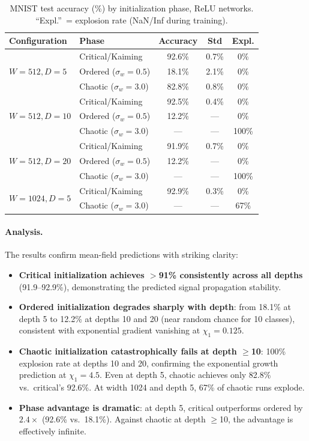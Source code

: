 \documentclass[10pt]{article}
\begin{document}
\begin{table}[t]
\centering
\caption{MNIST test accuracy (\%) by initialization phase, ReLU networks. ``Expl.''\ = explosion rate (NaN/Inf during training).}
\label{tab:mnist-results}
\small
\begin{tabular}{@{}llccc@{}}
\toprule
\textbf{Configuration} & \textbf{Phase} & \textbf{Accuracy} & \textbf{Std} & \textbf{Expl.} \\
\midrule
\multirow{3}{*}{$W\!=\!512, D\!=\!5$}
  & Critical/Kaiming & 92.6\% & 0.7\% & 0\% \\
  & Ordered ($\sigma_w\!=\!0.5$) & 18.1\% & 2.1\% & 0\% \\
  & Chaotic ($\sigma_w\!=\!3.0$) & 82.8\% & 0.8\% & 0\% \\
\midrule
\multirow{3}{*}{$W\!=\!512, D\!=\!10$}
  & Critical/Kaiming & 92.5\% & 0.4\% & 0\% \\
  & Ordered ($\sigma_w\!=\!0.5$) & 12.2\% & --- & 0\% \\
  & Chaotic ($\sigma_w\!=\!3.0$) & --- & --- & 100\% \\
\midrule
\multirow{3}{*}{$W\!=\!512, D\!=\!20$}
  & Critical/Kaiming & 91.9\% & 0.7\% & 0\% \\
  & Ordered ($\sigma_w\!=\!0.5$) & 12.2\% & --- & 0\% \\
  & Chaotic ($\sigma_w\!=\!3.0$) & --- & --- & 100\% \\
\midrule
\multirow{2}{*}{$W\!=\!1024, D\!=\!5$}
  & Critical/Kaiming & 92.9\% & 0.3\% & 0\% \\
  & Chaotic ($\sigma_w\!=\!3.0$) & --- & --- & 67\% \\
\bottomrule
\end{tabular}
\end{table}

\paragraph{Analysis.}
The results confirm mean-field predictions with striking clarity:
\begin{itemize}[nosep]
    \item \textbf{Critical initialization achieves $>$91\% consistently across all depths} (91.9--92.9\%), demonstrating the predicted signal propagation stability.
    \item \textbf{Ordered initialization degrades sharply with depth}: from 18.1\% at depth 5 to 12.2\% at depths 10 and 20 (near random chance for 10 classes), consistent with exponential gradient vanishing at $\chi_1 = 0.125$.
    \item \textbf{Chaotic initialization catastrophically fails at depth $\geq$10}: 100\% explosion rate at depths 10 and 20, confirming the exponential growth prediction at $\chi_1 = 4.5$.
    Even at depth 5, chaotic achieves only 82.8\% vs.\ critical's 92.6\%.
    At width 1024 and depth 5, 67\% of chaotic runs explode.
    \item \textbf{Phase advantage is dramatic}: at depth 5, critical outperforms ordered by $2.4\times$ (92.6\% vs.\ 18.1\%).
    Against chaotic at depth $\geq$10, the advantage is effectively infinite.
\end{itemize}
\end{document}
